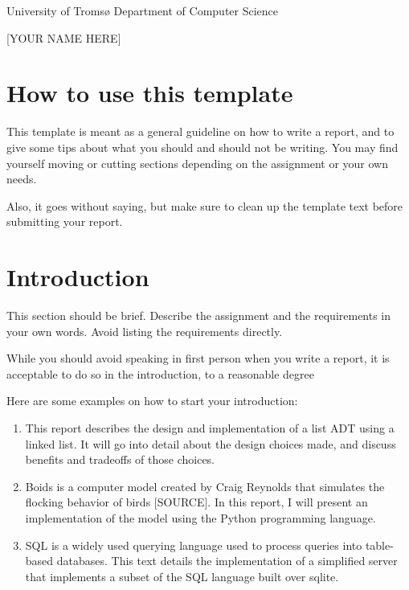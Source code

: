 \documentclass{article}
\begin{document}
\begin{center}
	\Huge {University of Tromsø \newline Department of Computer Science} \newline
	
	\begin{huge}
	\newline
	[SEMESTER 20XX]  \newline

	[YOUR NAME HERE] \newline

 	\end{huge}
\end{center}

\begin{flushleft}
\setcounter{page}{1}
\section[How to use this template]{How to use this template}
This template is meant as a general guideline on how to write a report, and to give some tips about what you should and should not be writing. You may find yourself moving or cutting sections depending on the assignment or your own needs.


\bigskip

Also, it goes without saying, but make sure to clean up the template text before submitting your report. 

\section{Introduction}
This section should be brief. Describe the assignment and the requirements in your own words. Avoid listing the requirements directly.


\bigskip

While you should avoid speaking in first person when you write a report, it is acceptable to do so in the introduction, to a reasonable degree


\bigskip

Here are some examples on how to start your introduction:

\begin{enumerate}
\item This report describes the design and implementation of a list ADT using a linked list. It will go into detail about the design choices made, and discuss benefits and tradeoffs of those choices.
\item Boids is a computer model created by Craig Reynolds that simulates the flocking behavior of birds [SOURCE]. In this report, I will present an implementation of the model using the Python programming language.
\item SQL is a widely used querying language used to process queries into table-based databases. This text details the implementation of a simplified server that implements a subset of the SQL language built over sqlite.
\end{enumerate}

\end{flushleft}
\end{document}
